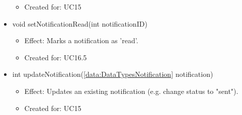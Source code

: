 \begin{description}
\begin{itemize}[noitemsep,nolistsep,leftmargin=-.25cm]
\begin{itemize}[noitemsep,nolistsep]
\item Created for: UC15
        \end{itemize}
      \item \textsf{void setNotificationRead(int notificationID)}
        \begin{itemize}[noitemsep,nolistsep]
           \item Effect: Marks a notification as 'read'.
\item Created for: UC16.5
        \end{itemize}
      \item \textsf{int updateNotification(\ref{data:DataTypesNotification} notification)}
        \begin{itemize}[noitemsep,nolistsep]
           \item Effect: Updates an existing notification (e.g. change status to "sent").
\item Created for: UC15
        \end{itemize}
    \end{itemize}
    \end{description}

